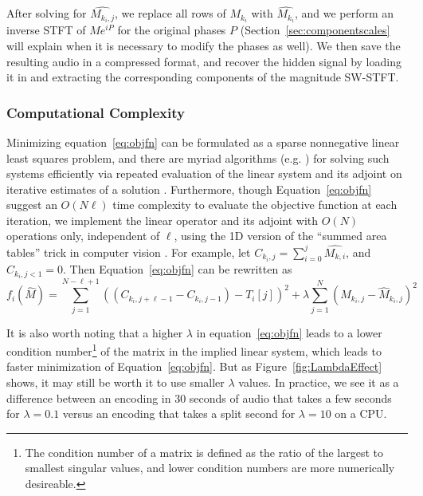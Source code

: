 \documentclass[runningheads]{llncs}
\begin{document}
After solving for $\hat{M_{k_i, j}}$, we replace all rows of $M_{k_i}$ with $\hat{M_{k_i}}$, and we perform an inverse STFT of $M e^{i P}$ for the original phases $P$ (Section~\ref{sec:componentscales} will explain when it is necessary to modify the phases as well).  We then save the resulting audio in a compressed format, and recover the hidden signal by loading it in and extracting the corresponding components of the magnitude SW-STFT.


\subsubsection{Computational Complexity}
\label{sec:computation}
Minimizing equation~\ref{eq:objfn} can be formulated as a sparse nonnegative linear least squares problem, and there are myriad algorithms (e.g. \cite{branch1999subspace}) for solving such systems efficiently via repeated evaluation of the linear system and its adjoint on iterative estimates of a solution .  Furthermore, though Equation~\ref{eq:objfn} suggest an $O(N \ell)$ time complexity to evaluate the objective function at each iteration, we implement the linear operator and its adjoint with $O(N)$ operations only, independent of $\ell$, using the 1D version of the ``summed area tables'' trick in computer vision \cite{lewisfast}.  For example, let $C_{k_i, j} = \sum_{i=0}^{j} \hat{M_{k, i}}$, and $C_{k_i, j < 1} = 0$.  Then Equation~\ref{eq:objfn} can be rewritten as 
\begin{equation}
  \label{eq:objfncumusum}
  f_i(\hat{M}) = \sum_{j=1}^{N-\ell+1} \left( (C_{k_i, j+\ell-1}-C_{k_i, j-1}) - T_i[j] \right)^2 + \lambda \sum_{j=1}^N \left( M_{k_i, j} - \hat{M}_{k_i, j} \right)^2
\end{equation}


It is also worth noting that a higher $\lambda$ in equation~\ref{eq:objfn} leads to a lower condition number\footnote{The condition number of a matrix is defined as the ratio of the largest to smallest singular values, and lower condition numbers are more numerically desireable.} of the matrix in the implied linear system, which leads to faster minimization of Equation~\ref{eq:objfn}.  But as Figure~\ref{fig:LambdaEffect} shows, it may still be worth it to use smaller $\lambda$ values.  In practice, we see it as a difference between an encoding in 30 seconds of audio that takes a few seconds for $\lambda=0.1$ versus an encoding that takes a split second for $\lambda=10$ on a CPU.
\end{document}
